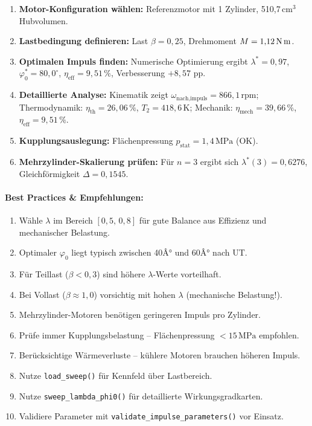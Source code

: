 ﻿\documentclass[a4paper,12pt]{article}
\begin{document}
\begin{enumerate}
  \item \textbf{Motor-Konfiguration wählen:} Referenzmotor mit 1 Zylinder,
    510{,}7\,cm$^3$ Hubvolumen.
  \item \textbf{Lastbedingung definieren:} Last $\beta = 0{,}25$, Drehmoment
    $M = 1{,}12\,\text{N\,m}$.
  \item \textbf{Optimalen Impuls finden:} Numerische Optimierung ergibt
    $\lambda^* = 0{,}97$, $\varphi_0^* = 80{,}0^\circ$, $\eta_\text{eff} = 9{,}51\,\%$,
    Verbesserung $+8{,}57$ pp.
  \item \textbf{Detaillierte Analyse:} Kinematik zeigt $\omega_\text{nach,impuls} = 866{,}1\,\text{rpm}$;
    Thermodynamik: $\eta_\text{th} = 26{,}06\,\%$, $T_2 = 418{,}6\,\text{K}$;
    Mechanik: $\eta_\text{mech} = 39{,}66\,\%$, $\eta_\text{eff} = 9{,}51\,\%$.
  \item \textbf{Kupplungsauslegung:} Flächenpressung $p_\text{stat} = 1{,}4\,\text{MPa}$ (OK).
  \item \textbf{Mehrzylinder-Skalierung prüfen:} Für $n=3$ ergibt sich
    $\lambda^*(3) = 0{,}6276$, Gleichförmigkeit $\Delta = 0{,}1545$.
\end{enumerate}

\paragraph{Best Practices \& Empfehlungen:}

\begin{enumerate}
  \item Wähle $\lambda$ im Bereich $[0{,}5,\, 0{,}8]$ für gute Balance aus
    Effizienz und mechanischer Belastung.
  \item Optimaler $\varphi_0$ liegt typisch zwischen 40Â° und 60Â° nach UT.
  \item Für Teillast ($\beta < 0{,}3$) sind höhere $\lambda$-Werte vorteilhaft.
  \item Bei Vollast ($\beta \approx 1{,}0$) vorsichtig mit hohen $\lambda$
    (mechanische Belastung!).
  \item Mehrzylinder-Motoren benötigen geringeren Impuls pro Zylinder.
  \item Prüfe immer Kupplungsbelastung -- Flächenpressung $< 15\,\text{MPa}$ empfohlen.
  \item Berücksichtige Wärmeverluste -- kühlere Motoren brauchen höheren Impuls.
  \item Nutze \texttt{load\_sweep()} für Kennfeld über Lastbereich.
  \item Nutze \texttt{sweep\_lambda\_phi0()} für detaillierte Wirkungsgradkarten.
  \item Validiere Parameter mit \texttt{validate\_impulse\_parameters()} vor Einsatz.
\end{enumerate}
\end{document}
